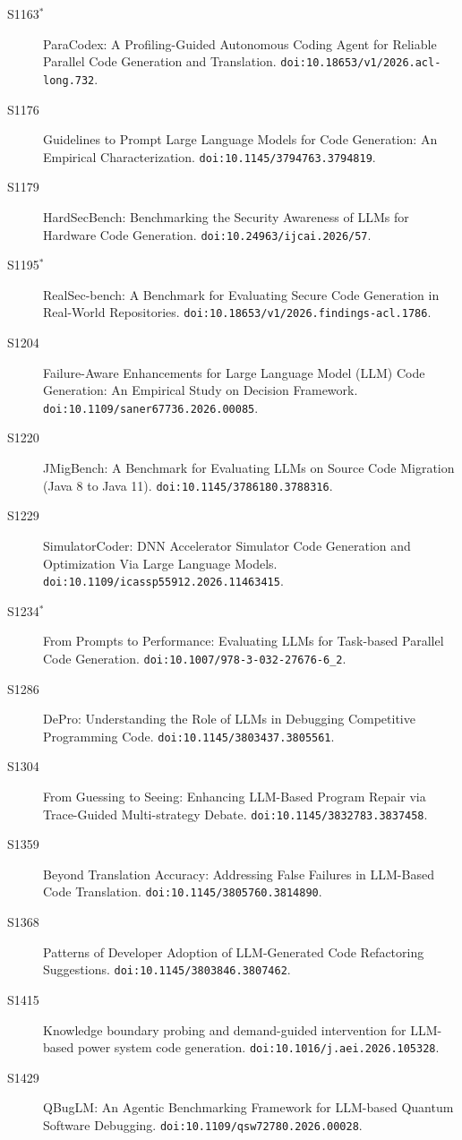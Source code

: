 {\begin{description}
\item[S1163$^\ast$] ParaCodex: A Profiling-Guided Autonomous Coding Agent for Reliable Parallel Code Generation and Translation. \texttt{doi:10.18653/v1/2026.acl-long.732}.
\item[S1176] Guidelines to Prompt Large Language Models for Code Generation: An Empirical Characterization. \texttt{doi:10.1145/3794763.3794819}.
\item[S1179] HardSecBench: Benchmarking the Security Awareness of LLMs for Hardware Code Generation. \texttt{doi:10.24963/ijcai.2026/57}.
\item[S1195$^\ast$] RealSec-bench: A Benchmark for Evaluating Secure Code Generation in Real-World Repositories. \texttt{doi:10.18653/v1/2026.findings-acl.1786}.
\item[S1204] Failure-Aware Enhancements for Large Language Model (LLM) Code Generation: An Empirical Study on Decision Framework. \texttt{doi:10.1109/saner67736.2026.00085}.
\item[S1220] JMigBench: A Benchmark for Evaluating LLMs on Source Code Migration (Java 8 to Java 11). \texttt{doi:10.1145/3786180.3788316}.
\item[S1229] SimulatorCoder: DNN Accelerator Simulator Code Generation and Optimization Via Large Language Models. \texttt{doi:10.1109/icassp55912.2026.11463415}.
\item[S1234$^\ast$] From Prompts to Performance: Evaluating LLMs for Task-based Parallel Code Generation. \texttt{doi:10.1007/978-3-032-27676-6\_2}.
\item[S1286] DePro: Understanding the Role of LLMs in Debugging Competitive Programming Code. \texttt{doi:10.1145/3803437.3805561}.
\item[S1304] From Guessing to Seeing: Enhancing LLM-Based Program Repair via Trace-Guided Multi-strategy Debate. \texttt{doi:10.1145/3832783.3837458}.
\item[S1359] Beyond Translation Accuracy: Addressing False Failures in LLM-Based Code Translation. \texttt{doi:10.1145/3805760.3814890}.
\item[S1368] Patterns of Developer Adoption of LLM-Generated Code Refactoring Suggestions. \texttt{doi:10.1145/3803846.3807462}.
\item[S1415] Knowledge boundary probing and demand-guided intervention for LLM-based power system code generation. \texttt{doi:10.1016/j.aei.2026.105328}.
\item[S1429] QBugLM: An Agentic Benchmarking Framework for LLM-based Quantum Software Debugging. \texttt{doi:10.1109/qsw72780.2026.00028}.

\end{description}}
